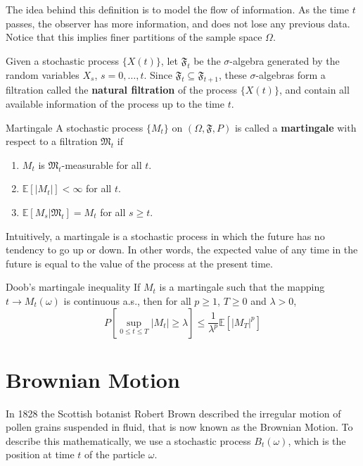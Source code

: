 The idea behind this definition is to model the flow of information. As the time $t$ passes, the observer has more information, and does not lose any previous data. Notice that this implies finer partitions of the sample space $\Omega$.

Given a stochastic process $\{ X(t) \}$, let $\mathfrak{F}_t$ be the $\sigma$-algebra generated by the random variables $X_s$, $s = 0, \ldots, t$. Since $\mathfrak{F}_t \subseteq \mathfrak{F}_{t+1}$, these $\sigma$-algebras form a filtration called the \textbf{natural filtration} of the process $\{ X(t) \}$, and contain all available information of the process up to the time $t$.

\begin{definition}[]{Martingale}{}
	A stochastic process $\{M_t \}$ on $(\Omega, \mathfrak{F}, P)$ is called a \textbf{martingale} with respect to a filtration $\mathfrak{M}_t$ if 
	\begin{enumerate}
		\item $M_t$ is $\mathfrak{M}_t$-measurable for all $t$.
		\item $\mathbb{E}[|M_t|] < \infty$ for all $t$.
		\item $\mathbb{E}[M_s | \mathfrak{M}_t] = M_t$ for all $s \geq t$.
	\end{enumerate}
\end{definition}

Intuitively, a martingale is a stochastic process in which the future has no tendency to go up or down. In other words, the expected value of any time in the future is equal to the value of the process at the present time.

\begin{theorem}[]{Doob's martingale inequality}{}
	If $M_t$ is a martingale such that the mapping $t \longrightarrow M_t(\omega)$ is continuous a.s., then for all $p \geq 1$, $T \geq 0$ and $\lambda > 0$,
	\[
		P \left[ \sup_{0 \leq t \leq T} |M_t| \geq \lambda \right] \leq \frac{1}{\lambda^p} \mathbb{E} [|M_T|^p]
	\]
\end{theorem}

\section{Brownian Motion}

In 1828 the Scottish botanist Robert Brown described the irregular motion of pollen grains suspended in fluid, that is now known as the Brownian Motion. To describe this mathematically, we use a stochastic process $B_t(\omega)$, which is the position at time $t$ of the particle $\omega$.


